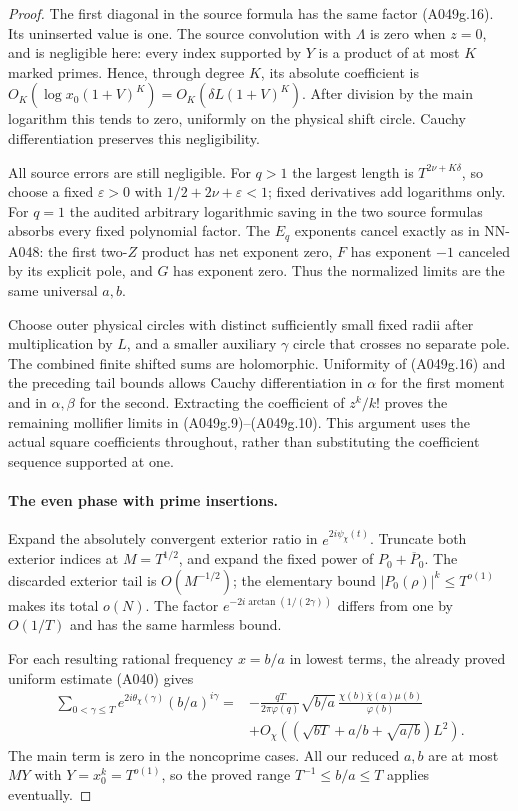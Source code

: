 \begin{proof}
The first diagonal in the source formula has the same factor
(A049g.16). Its uninserted value is one. The source convolution
with $\Lambda$ is zero when $z=0$, and is negligible here:
every index supported by $Y$ is a product of at most $K$ marked
primes. Hence, through degree $K$, its absolute coefficient is
$O_K(\log x_0(1+V)^K)=O_K(\delta L(1+V)^K)$. After division
by the main logarithm this tends to zero, uniformly on the
physical shift circle. Cauchy differentiation preserves this
negligibility.

All source errors are still negligible. For $q>1$ the largest
length is $T^{2\nu+K\delta}$, so choose a fixed
$\varepsilon>0$ with $1/2+2\nu+\varepsilon<1$; fixed
derivatives add logarithms only. For $q=1$ the audited
arbitrary logarithmic saving in the two source formulas
absorbs every fixed polynomial factor. The $E_q$ exponents
cancel exactly as in NN-A048: the first two-$Z$ product has
net exponent zero, $F$ has exponent $-1$ canceled by its
explicit pole, and $G$ has exponent zero. Thus the normalized
limits are the same universal $a,b$.

Choose outer physical circles with distinct sufficiently small
fixed radii after multiplication by $L$, and a smaller auxiliary
$\gamma$ circle that crosses no separate pole. The combined
finite shifted sums are holomorphic. Uniformity of
(A049g.16) and the preceding tail bounds allows Cauchy
differentiation in $\alpha$ for the first moment and in
$\alpha,\beta$ for the second. Extracting the coefficient
of $z^k/k!$ proves the remaining mollifier limits in
(A049g.9)--(A049g.10). This argument uses the actual square
coefficients throughout, rather than substituting the
coefficient sequence supported at one.

\paragraph{The even phase with prime insertions.}
Expand the absolutely convergent exterior ratio in
$e^{2i\psi_\chi(t)}$. Truncate both exterior indices at
$M=T^{1/2}$, and expand the fixed power of $P_0+\overline P_0$.
The discarded exterior tail is $O(M^{-1/2})$; the elementary
bound $|P_0(\rho)|^k\le T^{o(1)}$ makes its total $o(N)$.
The factor $e^{-2i\arctan(1/(2\gamma))}$ differs from one
by $O(1/T)$ and has the same harmless bound.

For each resulting rational frequency $x=b/a$ in lowest terms,
the already proved uniform estimate (A040) gives
\begin{align*}
 \sum_{0<\gamma\le T}e^{2i\theta_\chi(\gamma)}(b/a)^{i\gamma}
 ={}&-\frac{qT}{2\pi\varphi(q)}\sqrt{b/a}\,
       \frac{\chi(b)\bar\chi(a)\mu(b)}{\varphi(b)}\\
 &+O_\chi\left((\sqrt{bT}+a/b+\sqrt{a/b})L^2\right).
\end{align*}
The main term is zero in the noncoprime cases. All our reduced
$a,b$ are at most $MY$ with $Y=x_0^k=T^{o(1)}$, so the
proved range $T^{-1}\le b/a\le T$ applies eventually.


\end{proof}
